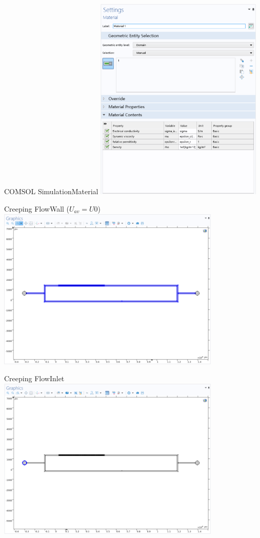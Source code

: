 \documentclass[11pt]{beamer}
\begin{document}
\begin{frame}{COMSOL Simulation}{Material}
    \includegraphics[width=0.6\textwidth]{10.png}
\end{frame}
\begin{frame}{Creeping Flow}{Wall ($U_{av}=U0$)}
    \includegraphics[width=0.8\textwidth]{11.png}
\end{frame}
\begin{frame}{Creeping Flow}{Inlet}
    \includegraphics[width=0.8\textwidth]{12.png}
\end{frame}
\end{document}
